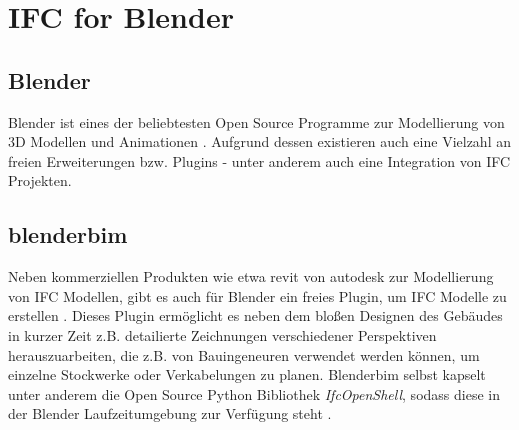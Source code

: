 \section{IFC for Blender}\label{basics:blender}
\subsection{Blender}
Blender ist eines der beliebtesten Open Source Programme zur Modellierung von 3D Modellen und Animationen \cite{blendero56:online}.
Aufgrund dessen existieren auch eine Vielzahl an freien Erweiterungen bzw. Plugins - unter anderem auch eine Integration von IFC Projekten.

\subsection{blenderbim}
Neben kommerziellen Produkten wie etwa revit von autodesk \cite{RevitSof26:online} zur Modellierung von IFC Modellen, gibt es auch für Blender ein freies Plugin, um IFC Modelle zu erstellen \cite{BlenderB43:online}.
Dieses Plugin ermöglicht es neben dem bloßen Designen des Gebäudes in kurzer Zeit z.B. detailierte Zeichnungen verschiedener Perspektiven herauszuarbeiten, die z.B. von Bauingeneuren verwendet werden können, um einzelne Stockwerke oder Verkabelungen zu planen.
Blenderbim selbst kapselt unter anderem die Open Source Python Bibliothek \textit{IfcOpenShell}, sodass diese in der Blender Laufzeitumgebung zur Verfügung steht \cite{IFCOpenShell:online}.

